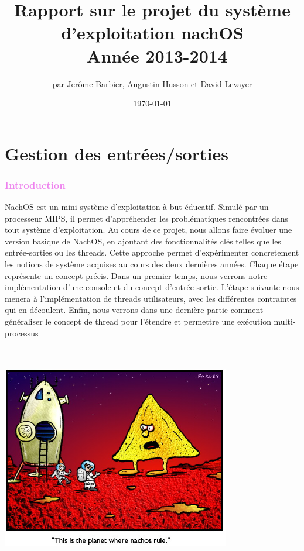 \documentclass[a4paper,10pt]{report}
\title{Rapport sur le projet du système d'exploitation nachOS\\ Année 2013-2014}
\author{par Jerôme Barbier, Augustin Husson et David Levayer}
\date{\today}
\begin{document}
   \maketitle
  \tableofcontents
  \newpage

  \part{Gestion des entrées/sorties}
     \textcolor{Violet}{\section{Introduction}}
  NachOS est un mini-système d'exploitation à but éducatif. Simulé par un processeur MIPS, 
  il permet d'appréhender les problématiques rencontrées dans tout système d'exploitation. 
  Au cours de ce projet, nous allons faire évoluer une version basique de NachOS, en ajoutant des 
  fonctionnalités clés telles que les entrée-sorties ou les threads. Cette approche permet d'expérimenter concretement
  les notions de système acquises au cours des deux dernières années. Chaque étape représente un concept précis. Dans un premier
  temps, nous verrons notre implémentation d'une console et du concept d'entrée-sortie. L'étape suivante nous menera à
  l'implémentation de threads utilisateurs, avec les différentes contraintes qui en découlent. Enfin, nous verrons dans une dernière
  partie comment généraliser le concept de thread pour l'étendre et permettre une exécution multi-processus
      \begin{center}
    \includegraphics[width=10cm,height=10cm]{nachos.png}\\
    \end{center}
\end{document}
